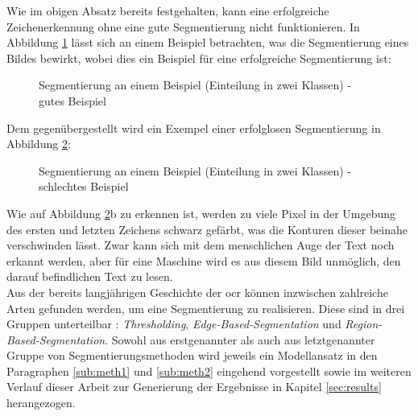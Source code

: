 		Wie im obigen Absatz bereits festgehalten, kann eine erfolgreiche Zeichenerkennung ohne eine gute Segmentierung nicht funktionieren. In Abbildung \ref{fig:seg-example-good} lässt sich an einem Beispiel betrachten, was die Segmentierung eines Bildes bewirkt, wobei dies ein Beispiel für eine erfolgreiche Segmentierung ist:
		\begin{figure}[H]
			\centering
			\qquad
			\caption{Segmentierung an einem Beispiel (Einteilung in zwei Klassen) - gutes Beispiel}
			\label{fig:seg-example-good}
		\end{figure}
		Dem gegenübergestellt wird ein Exempel einer erfolglosen Segmentierung in Abbildung \ref{fig:seg-example-bad}:
		\begin{figure}[H]
			\centering
			\qquad
			\caption{Segmentierung an einem Beispiel (Einteilung in zwei Klassen) - schlechtes Beispiel}
			\label{fig:seg-example-bad}
		\end{figure}
		Wie auf Abbildung \ref{fig:seg-example-bad}b zu erkennen ist, werden zu viele Pixel in der Umgebung des ersten und letzten Zeichens schwarz gefärbt, was die Konturen dieser beinahe verschwinden lässt. Zwar kann sich mit dem menschlichen Auge der Text noch erkannt werden, aber für eine Maschine wird es aus diesem Bild unmöglich, den darauf befindlichen Text zu lesen.\\
		Aus der bereits langjährigen Geschichte der \gls{ocr} können inzwischen zahlreiche Arten gefunden werden, um eine Segmentierung zu realisieren. Diese sind in drei Gruppen unterteilbar \cite[Kapitel 10]{gonzalez-woods}: \textit{Thresholding}, \textit{Edge-Based-Segmentation} und \textit{Region-Based-Segmentation}. Sowohl aus erstgenannter als auch aus letztgenannter Gruppe von Segmentierungsmethoden wird jeweils ein Modellansatz in den Paragraphen \ref{sub:meth1} und \ref{sub:meth2} eingehend vorgestellt sowie im weiteren Verlauf dieser Arbeit zur Generierung der Ergebnisse in Kapitel \ref{sec:results} herangezogen. \\


